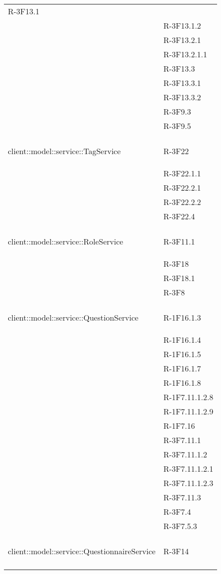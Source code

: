 \begin{longtable}{l p{3cm}}
	R-3F13.1 \tabularnewline &
	
	R-3F13.1.2 \tabularnewline &
	
	R-3F13.2.1 \tabularnewline &
	
	R-3F13.2.1.1 \tabularnewline &
	
	R-3F13.3 \tabularnewline &
	
	R-3F13.3.1 \tabularnewline &
	
	R-3F13.3.2 \tabularnewline &
	
	R-3F9.3 \tabularnewline &
	
	R-3F9.5 \tabularnewline &\tabularnewline
	\hline
	\hypertarget{client::model::service::TagService}{client::model::service::TagService} & R-3F22 \tabularnewline &
	
	R-3F22.1.1 \tabularnewline &
	
	R-3F22.2.1 \tabularnewline &
	
	R-3F22.2.2 \tabularnewline &
	
	R-3F22.4 \tabularnewline &\tabularnewline
	\hline
	\hypertarget{client::model::service::RoleService}{client::model::service::RoleService} & R-3F11.1 \tabularnewline &
	
	R-3F18 \tabularnewline &
	
	R-3F18.1 \tabularnewline &
	
	R-3F8 \tabularnewline &\tabularnewline
	\hline
	\hypertarget{client::model::service::QuestionService}{client::model::service::QuestionService} & R-1F16.1.3 \tabularnewline &
	
	R-1F16.1.4 \tabularnewline &
	
	R-1F16.1.5 \tabularnewline &
	
	R-1F16.1.7 \tabularnewline &
	
	R-1F16.1.8 \tabularnewline &
	
	R-1F7.11.1.2.8 \tabularnewline &
	
	R-1F7.11.1.2.9 \tabularnewline &
	
	R-1F7.16 \tabularnewline &
	
	R-3F7.11.1 \tabularnewline &
	
	R-3F7.11.1.2 \tabularnewline &
	
	R-3F7.11.1.2.1 \tabularnewline &
	
	R-3F7.11.1.2.3 \tabularnewline &
	
	R-3F7.11.3 \tabularnewline &
	
	R-3F7.4 \tabularnewline &
	
	R-3F7.5.3 \tabularnewline &\tabularnewline
	\hline
	\hypertarget{client::model::service::QuestionnaireService}{client::model::service::QuestionnaireService} & R-3F14 \tabularnewline &
	

\end{longtable}
